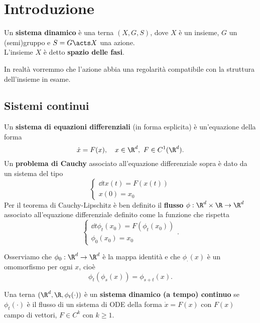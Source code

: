 \chapter*{Introduzione}


\begin{definition}
Un \textbf{sistema dinamico} \`e una terna $(X,G,S)$, dove $X$ \`e un insieme, $G$ un (semi)gruppo e $S=G\acts X$ una azione.\\
L'insieme $X$ \`e detto \textbf{spazio delle fasi}.
\end{definition}
\begin{remark}
In realt\`a vorremmo che l'azione abbia una regolarit\`a compatibile con la struttura dell'insieme in esame.
\end{remark}


\section*{Sistemi continui}
\begin{definition}
Un \textbf{sistema di equazioni differenziali} (in forma esplicita) \`e un'equazione della forma
\[\dot x=F(x),\quad x\in\R^d, \ F\in C^1(\R^d).\]
Un \textbf{problema di Cauchy} associato all'equazione differenziale sopra \`e dato da un sistema del tipo
\[\begin{cases}
\dd t{}x(t)=F(x(t))\\
x(0)=x_0
\end{cases}\]
Per il teorema di Cauchy-Lipschitz \`e ben definito il \textbf{flusso} $\phi:\R^d\times \R\to \R^d$ associato all'equazione differenziale definito come la funzione che rispetta 
\[\begin{cases}
\dd t{}\phi_t(x_0)=F(\phi_t(x_0))\\
\phi_0(x_0)=x_0
\end{cases}.\]
\end{definition}

\begin{remark}
Osserviamo che $\phi_0:\R^d\to \R^d$ \`e la mappa identit\`a e che $\phi_{\cdot}(x)$ \`e un omomorfismo per ogni $x$, cio\`e
\[\phi_t(\phi_s(x))=\phi_{s+t}(x).\]
\end{remark}

\begin{definition}
Una terna $(\R^d,\R,\phi_t(\cdot))$ \`e un \textbf{sistema dinamico (a tempo) continuo} se $\phi_t(\cdot)$ \`e il flusso di un sistema di ODE della forma $\dot x=F(x)$ con $F(x)$ campo di vettori, $F\in C^k$ con $k\geq1$.
\end{definition}


